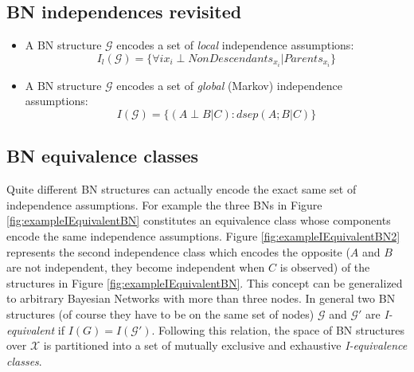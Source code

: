 \subsection{BN independences revisited}
\begin{itemize}
    \item A BN structure $\mathcal{G}$ encodes a set of \textit{local} independence assumptions:
    $$I_l(\mathcal{G}) = \{\forall i x_i \perp \mathit{NonDescendants}_{x_i}|\mathit{Parents}_{x_i}\}$$
    
    \item A BN structure $\mathcal{G}$ encodes a set of \textit{global} (Markov) independence assumptions:
    $$I(\mathcal{G}) = \{(A \perp B | C) : \mathit{dsep}(A;B|C)\}$$
\end{itemize}

\subsection{BN equivalence classes}
Quite different BN structures can actually encode the exact same set of independence assumptions. For example the three BNs in Figure \ref{fig:exampleIEquivalentBN} constitutes an equivalence class whose components encode the same independence assumptions. Figure \ref{fig:exampleIEquivalentBN2} represents the second independence class which encodes the opposite ($A$ and $B$ are not independent, they become independent when $C$ is observed) of the structures in Figure \ref{fig:exampleIEquivalentBN}. This concept can be generalized to arbitrary Bayesian Networks with more than three nodes. In general two BN structures (of course they have to be on the same set of nodes) $\mathcal{G}$ and $\mathcal{G}'$ are \textit{I-equivalent} if $I(G)=I(\mathcal{G}')$. Following this relation, the space of BN structures over $\mathcal{X}$ is partitioned into a set of mutually exclusive and exhaustive \textit{I-equivalence classes}.

